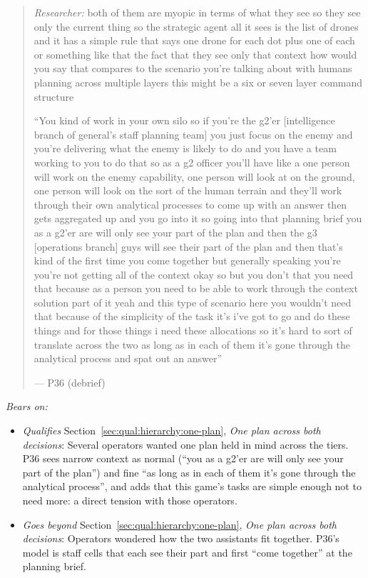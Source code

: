 \begin{quote}\small
{\footnotesize\textit{Researcher:} both of them are myopic in terms of what they see so they see only the current thing so the strategic agent all it sees is the list of drones and it has a simple rule that says one drone for each dot plus one of each or something like that the fact that they see only that context how would you say that compares to the scenario you're talking about with humans planning across multiple layers this might be a six or seven layer command structure}\par\smallskip
``You kind of work in your own silo so if you're the g2'er [intelligence branch of general's staff planning team] you just focus on the enemy and you're delivering what the enemy is likely to do and you have a team working to you to do that so as a g2 officer you'll have like a one person will work on the enemy capability, one person will look at on the ground, one person will look on the sort of the human terrain and they'll work through their own analytical processes to come up with an answer then gets aggregated up and you go into it so going into that planning brief you as a g2'er are will only see your part of the plan and then the g3 [operations branch] guys will see their part of the plan and then that's kind of the first time you come together but generally speaking you're you're not getting all of the context okay so but you don't that you need that because as a person you need to be able to work through the context solution part of it yeah and this type of scenario here you wouldn't need that because of the simplicity of the task it's i've got to go and do these things and for those things i need these allocations so it's hard to sort of translate across the two as long as in each of them it's gone through the analytical process and spat out an answer''\par\hfill--- P36 (debrief)
\end{quote}

\noindent\textit{Bears on:}
\begin{itemize}[leftmargin=1.2em,itemsep=1pt]\small
\item \textit{Qualifies} Section~\ref{sec:qual:hierarchy:one-plan}, \emph{One plan across both decisions}: Several operators wanted one plan held in mind across the tiers. P36 sees narrow context as normal (``you as a g2'er are will only see your part of the plan'') and fine ``as long as in each of them it's gone through the analytical process'', and adds that this game's tasks are simple enough not to need more: a direct tension with those operators.
\item \textit{Goes beyond} Section~\ref{sec:qual:hierarchy:one-plan}, \emph{One plan across both decisions}: Operators wondered how the two assistants fit together. P36's model is staff cells that each see their part and first ``come together'' at the planning brief.
\end{itemize}

